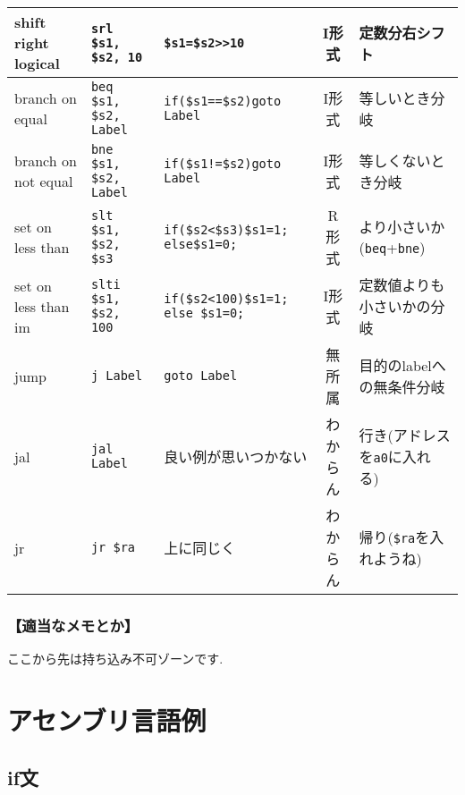 \documentclass[a4paper, xelatex, ja=standard]{bxjsarticle}
\begin{document}
\begin{table}[h]
{\begin{tabular}{|l|l|l|c|l|}
shift right logical        & \texttt{srl \$s1, \$s2, 10}    & \texttt{\$s1=\$s2>>10} & I形式 & 定数分右シフト \\ \hline
branch on equal            & \texttt{beq \$s1, \$s2, Label} & \texttt{if(\$s1==\$s2)goto Label} & I形式 & 等しいとき分岐 \\ \hline
branch on not equal        & \texttt{bne \$s1, \$s2, Label} & \texttt{if(\$s1!=\$s2)goto Label} & I形式 & 等しくないとき分岐 \\ \hline
set on less than           & \texttt{slt \$s1, \$s2, \$s3}  & \texttt{if(\$s2<\$s3)\$s1=1; else\$s1=0;} & R形式 & より小さいか(\texttt{beq}+\texttt{bne})\\\hline
set on less than im & \texttt{slti \$s1, \$s2, 100}  & \texttt{if(\$s2<100)\$s1=1; else \$s1=0;} & I形式 &定数値よりも小さいかの分岐 \\ \hline
jump                       & \texttt{j Label} & \texttt{goto Label} & 無所属 & 目的のlabelへの無条件分岐\\ \hline
jal & \texttt{jal Label} & 良い例が思いつかない & わからん & 行き(アドレスを\texttt{a0}に入れる) \\ \hline
jr                   & \texttt{jr \$ra} & 上に同じく & わからん & 帰り(\texttt{\$ra}を入れようね) \\ \hline
\end{tabular}
}
\end{table}

\clearpage
\subsubsection*{【適当なメモとか】}
\clearpage
\begin{center}
ここから先は持ち込み不可ゾーンです.
\end{center}
\section{アセンブリ言語例}
\subsection{if文}
\end{document}
